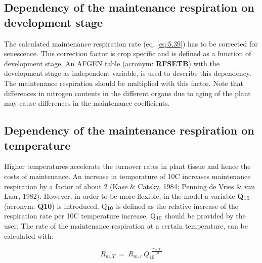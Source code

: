 
\subsection{Dependency of the maintenance respiration on development stage}
The calculated maintenance respiration rate (eq. \ref{eq:5.39}) has to be corrected for senescence.
This correction factor is crop specific and is defined as a function of development stage. 
An AFGEN table (acronym: {\bf RFSETB}) with the development stage as
independent variable, is used to describe this dependency. The maintenance respiration
should be multiplied with this factor.  Note that differences in nitrogen contents in the different organs 
due to aging of the plant may cause differences in the maintenance coefficients. 

\subsection{Dependency of the maintenance respiration on temperature}
Higher temperatures accelerate the turnover rates in plant tissue and hence the costs of
maintenance. An increase in temperature of 10\textdegree C increases maintenance respiration by a
factor of about 2 (Kase \& Catsky, 1984; Penning de Vries \& van Laar, 1982). However,
in order to be more flexible, in the model a variable {\bf Q$_{{\rm 10}}$} (acronym: {\bf Q10}) is introduced.
Q$_{{\rm 10}}$ is defined as the relative increase of the respiration rate per 10\degrees C temperature
increase. Q$_{{\rm 10}}$ should be provided by the user. The rate of the maintenance respiration at a
certain temperature, can be calculated with:

\begin{equation}
\label{eq:5.40}
R _{m,T} ~=~ R _{m,r} \, Q _{10}^{~~{\frac{T-T _{r} }{10}} }
\end{equation}

